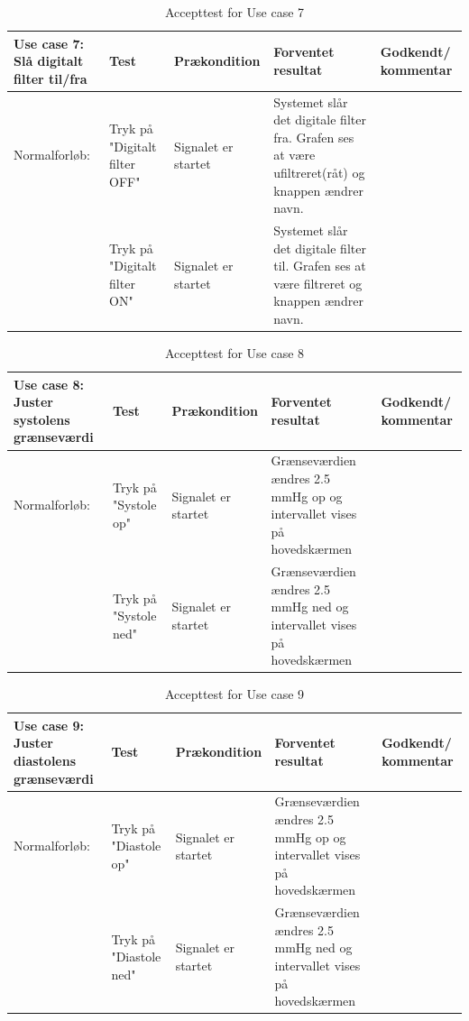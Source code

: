 \begin{table}[H]
\caption{Accepttest for Use case 7}\label{tab:tabel8}
\begin{tabular}{|>{\raggedright\arraybackslash}p{2.5cm}| >{\raggedright\arraybackslash}p{2.9cm} | >{\raggedright\arraybackslash}p{2.9cm} | >{\raggedright\arraybackslash}p{2.9cm} | >{\raggedright\arraybackslash}p{2.8cm} |}
   \hline
   \textbf{Use case 7: Slå digitalt filter til/fra} &\textbf{Test}& \textbf{Prækondition} & \textbf{Forventet resultat} & \textbf{Godkendt/ kommentar}\\ \hline
   Normalforløb:& Tryk på "Digitalt filter OFF" & Signalet er startet & Systemet slår det digitale filter fra. Grafen ses at være ufiltreret(råt) og knappen ændrer navn. &\\\hline
   &Tryk på "Digitalt filter ON" & Signalet er startet & Systemet slår det digitale filter til. Grafen ses at være filtreret og knappen ændrer navn. &\\\hline
\end{tabular}
\end{table}


\begin{table}[H]
\caption{Accepttest for Use case 8}\label{tab:tabel8}
\begin{tabular}{|>{\raggedright\arraybackslash}p{2.5cm}| >{\raggedright\arraybackslash}p{2.9cm} | >{\raggedright\arraybackslash}p{2.9cm} | >{\raggedright\arraybackslash}p{2.9cm} | >{\raggedright\arraybackslash}p{2.8cm} |}
   \hline
   \textbf{Use case 8: Juster systolens grænseværdi } &\textbf{Test}& \textbf{Prækondition} & \textbf{Forventet resultat} & \textbf{Godkendt/ kommentar}\\ \hline
   Normalforløb:& Tryk på "Systole op"& Signalet er startet & Grænseværdien ændres 2.5 mmHg op og intervallet vises på hovedskærmen &\\\hline
   &Tryk på "Systole ned" & Signalet er startet & Grænseværdien ændres 2.5 mmHg ned og intervallet vises på hovedskærmen & \\\hline
\end{tabular}
\end{table}

\begin{table}[H]
\caption{Accepttest for Use case 9}\label{tab:tabel8}
\begin{tabular}{|>{\raggedright\arraybackslash}p{2.5cm}| >{\raggedright\arraybackslash}p{2.9cm} | >{\raggedright\arraybackslash}p{2.9cm} | >{\raggedright\arraybackslash}p{2.9cm} | >{\raggedright\arraybackslash}p{2.8cm} |}
   \hline
   \textbf{Use case 9: Juster diastolens grænseværdi } &\textbf{Test}& \textbf{Prækondition} & \textbf{Forventet resultat} & \textbf{Godkendt/ kommentar}\\ \hline
   Normalforløb:& Tryk på "Diastole op"& Signalet er startet & Grænseværdien ændres 2.5 mmHg op og intervallet vises på hovedskærmen &\\\hline
   &Tryk på "Diastole ned" & Signalet er startet & Grænseværdien ændres 2.5 mmHg ned og intervallet vises på hovedskærmen & \\\hline
\end{tabular}
\end{table}

